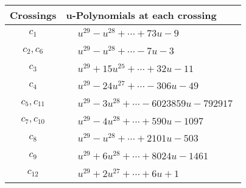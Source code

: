 \documentclass[1p]{elsarticle_modified}
\theoremstyle{definition}
\begin{document}
\begin{tabular}{m{50pt}|m{274pt}}
Crossings & \hspace{64pt}u-Polynomials at each crossing \\
\hline $$\begin{aligned}c_{1}\end{aligned}$$&$\begin{aligned}
&u^{29}- u^{28}+\cdots+73 u-9
\end{aligned}$\\
\hline $$\begin{aligned}c_{2},c_{6}\end{aligned}$$&$\begin{aligned}
&u^{29}- u^{28}+\cdots-7 u-3
\end{aligned}$\\
\hline $$\begin{aligned}c_{3}\end{aligned}$$&$\begin{aligned}
&u^{29}+15 u^{25}+\cdots+32 u-11
\end{aligned}$\\
\hline $$\begin{aligned}c_{4}\end{aligned}$$&$\begin{aligned}
&u^{29}-24 u^{27}+\cdots-306 u-49
\end{aligned}$\\
\hline $$\begin{aligned}c_{5},c_{11}\end{aligned}$$&$\begin{aligned}
&u^{29}-3 u^{28}+\cdots-6023859 u-792917
\end{aligned}$\\
\hline $$\begin{aligned}c_{7},c_{10}\end{aligned}$$&$\begin{aligned}
&u^{29}-4 u^{28}+\cdots+590 u-1097
\end{aligned}$\\
\hline $$\begin{aligned}c_{8}\end{aligned}$$&$\begin{aligned}
&u^{29}- u^{28}+\cdots+2101 u-503
\end{aligned}$\\
\hline $$\begin{aligned}c_{9}\end{aligned}$$&$\begin{aligned}
&u^{29}+6 u^{28}+\cdots+8024 u-1461
\end{aligned}$\\
\hline $$\begin{aligned}c_{12}\end{aligned}$$&$\begin{aligned}
&u^{29}+2 u^{27}+\cdots+6 u+1
\end{aligned}$\\
\hline
\end{tabular}\\~\\
\end{document}
